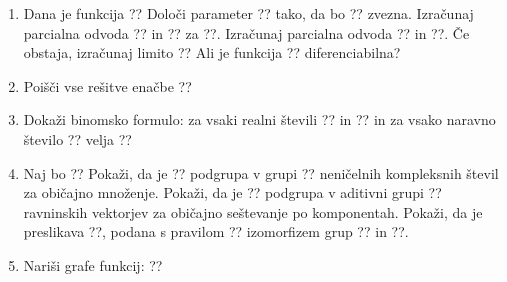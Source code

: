 \documentclass[a4paper,12pt]{article}
\begin{document}
\begin{enumerate}
\item Dana je funkcija
??
Določi parameter ?? tako, da bo ?? zvezna.
Izračunaj parcialna odvoda ?? in ?? za ??.
Izračunaj parcialna odvoda ?? in ??.
Če obstaja, izračunaj limito
??
Ali je funkcija ?? diferenciabilna?

\item Poišči vse rešitve enačbe
??

\item Dokaži binomsko formulo: za vsaki realni števili ?? in ?? in za vsako naravno število ?? velja
??

\item Naj bo
??
Pokaži, da je ?? podgrupa v grupi ??
neničelnih kompleksnih števil za običajno množenje.
Pokaži, da je ?? podgrupa v aditivni grupi ??
ravninskih vektorjev za običajno seštevanje po komponentah.
Pokaži, da je preslikava ??, podana s pravilom
??
izomorfizem grup ?? in ??.

\item Nariši grafe funkcij:
??

\end{enumerate}
\end{document}
